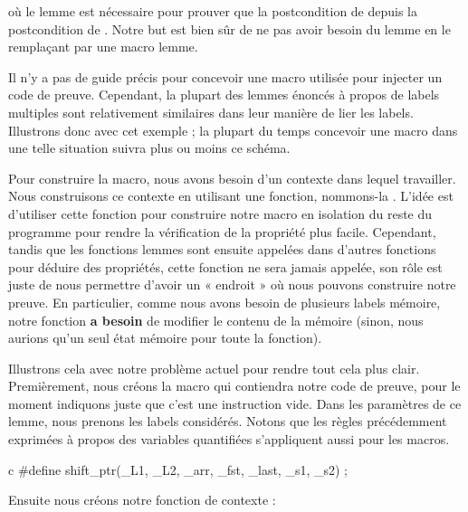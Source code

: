 

où le lemme  est nécessaire pour prouver que la
postcondition de  depuis la postcondition de
. Notre but est bien sûr de ne pas avoir besoin du
lemme en le remplaçant par une macro lemme.


Il n'y a pas de guide précis pour concevoir une macro utilisée pour injecter
un code de preuve. Cependant, la plupart des lemmes énoncés à propos de labels
multiples sont relativement similaires dans leur manière de lier les labels. 
Illustrons donc avec cet exemple ; la plupart du temps concevoir une macro dans
une telle situation suivra plus ou moins ce schéma.


Pour construire la macro, nous avons besoin d'un contexte dans lequel travailler.
Nous construisons ce contexte en utilisant une fonction,
nommons-la . L'idée est d'utiliser
cette fonction pour construire notre macro en isolation du reste du programme pour
rendre la vérification de la propriété plus facile. Cependant, tandis que les 
fonctions lemmes sont ensuite appelées dans d'autres fonctions pour déduire
des propriétés, cette fonction ne sera jamais appelée, son rôle est juste de nous
permettre d'avoir un « endroit » où nous pouvons construire notre preuve. En
particulier, comme nous avons besoin de plusieurs labels mémoire, notre fonction
\textbf{a besoin} de modifier le contenu de la mémoire (sinon, nous aurions qu'un
seul état mémoire pour toute la fonction).


Illustrons cela avec notre problème actuel pour rendre tout cela plus clair.
Premièrement, nous créons la macro  qui contiendra notre
code de preuve, pour le moment indiquons juste que c'est une instruction vide.
Dans les paramètres de ce lemme, nous prenons les labels considérés. Notons que
les règles précédemment exprimées à propos des variables quantifiées s'appliquent
aussi pour les macros.


\begin{CodeBlock}{c}
#define shift_ptr(_L1, _L2, _arr, _fst, _last, _s1, _s2) ;
\end{CodeBlock}


Ensuite nous créons notre fonction de contexte :




